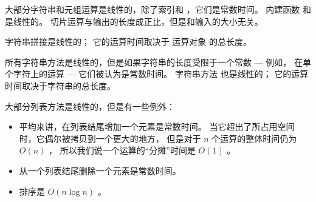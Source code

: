 大部分字符串和元组运算是线性的，除了索引和 ，它们是常数时间。
内建函数  和  是线性的。
切片运算与输出的长度成正比，但是和输入的大小无关。
  
  


字符串拼接是线性的； 它的运算时间取决于 运算对象 的总长度。


所有字符串方法是线性的，但是如果字符串的长度受限于一个常数 --- 例如，
在单个字符上的运算 --- 它们被认为是常数时间。
字符串方法  也是线性的； 它的运算时间取决于字符串的总长度。



大部分列表方法是线性的，但是有一些例外：

\begin{itemize}


\item 平均来讲，在列表结尾增加一个元素是常数时间。 当它超出了所占用空间时，它偶尔被拷贝到一个更大的地方， 但是对于 $n$ 个运算的整体时间仍为 $O(n)$ ， 所以我们说一个运算的“分摊”时间是 $O(1)$ 。


\item 从一个列表结尾删除一个元素是常数时间。


\item 排序是 $O(n \log n)$ 。
  

\end{itemize}

